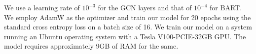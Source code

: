 We use a learning rate of $10^{-3}$ for the GCN layers and that of $10^{-4}$ for BART. We employ AdamW \cite{loshchilov-etal-adamw} as the optimizer and train our model for 20 epochs using the standard cross entropy loss on a batch size of 16. We train our model on a system running an Ubuntu operating system with a Tesla V100-PCIE-32GB GPU. The model requires approximately 9GB of RAM for the same. 


